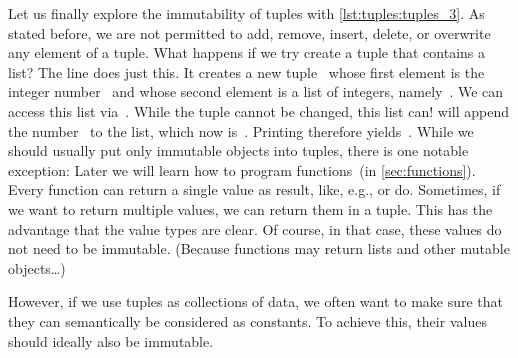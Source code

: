 %
%
%
%
%
%
%
%

Let us finally explore the immutability of tuples with \cref{lst:tuples:tuples_3}.
As stated before, we are not permitted to add, remove, insert, delete, or overwrite any element of a tuple.
What happens if we try create a tuple that contains a list?
The line  does just this.
It creates a new tuple~ whose first element is the integer number~ and whose second element is a list of integers, namely~\pythonil{[2]}.
We can access this list via~.
While the tuple cannot be changed, this list can!
 will append the number~ to the list, which now is~\pythonil{[2, 2]}.
Printing  therefore yields~.
%
%
%
While we should usually put only immutable objects into tuples, there is one notable exception:
Later we will learn how to program functions~(in \cref{sec:functions}).
Every function can return a single value as result, like, e.g.,  or  do.
Sometimes, if we want to return multiple values, we can return them in a tuple.
This has the advantage that the value types are clear.
Of course, in that case, these values do not need to be immutable.
(Because functions may return lists and other mutable objects\dots)

However, if we use tuples as collections of data, we often want to make sure that they can semantically be considered as constants.
To achieve this, their values should ideally also be immutable.

